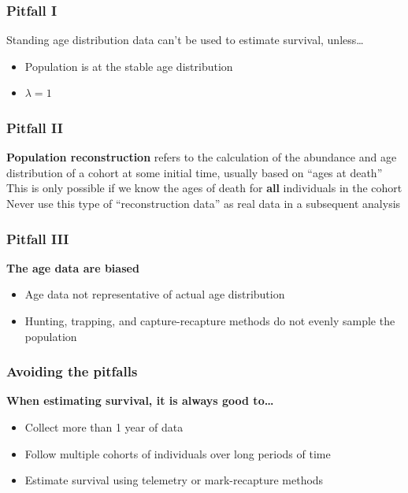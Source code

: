 \documentclass[color=usenames,dvipsnames]{beamer}\usepackage[]{graphicx}\usepackage[]{color}
\begin{document}
\begin{frame}
  \frametitle{Pitfall I}
  \large
  {Standing age distribution data can't be used to estimate
    survival, unless\dots}
  \begin{itemize}
    \item Population is at the stable age distribution
    \item $\lambda = 1$
  \end{itemize}
\end{frame}



\begin{frame}
  \frametitle{Pitfall II}
  \large
  {\bf Population reconstruction} refers to the calculation of the abundance
  and age distribution of a cohort at some initial time, usually based
  on ``ages at death'' \\
  \pause
  \vspace{0.5cm}
  This is only possible if we know the ages of death for \alert{\bf all}
  individuals in the cohort \\
  \pause
  \vspace{0.5cm}
  Never use this type of ``reconstruction data'' as real data in a
  subsequent analysis
\end{frame}




\begin{frame}
  \frametitle{Pitfall III}
  \Large
  {\bf The age data are biased}
  \large
  \begin{itemize}
    \item Age data not representative of actual age distribution
    \item Hunting, trapping, and capture-recapture methods do not
      evenly sample the population
  \end{itemize}
\end{frame}





\begin{frame}
  \frametitle{Avoiding the pitfalls}
  \large
  {\bf When estimating survival, it is always good to\dots}
  \begin{itemize}
    \item Collect more than 1 year of data
    \item Follow multiple cohorts of individuals over long periods of time
    \item Estimate survival using telemetry or mark-recapture methods
  \end{itemize}
\end{frame}
\end{document}
